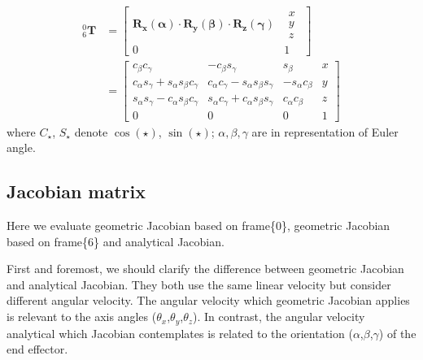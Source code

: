 \begin{equation}
\begin{split}
^0_6\mathbf{T} 
&= 
\begin{bmatrix}
\mathbf{R_x(\alpha ) \cdot R_y(\beta ) \cdot R_z(\gamma )} 
& \begin{matrix}
x\\ 
y\\ 
z
\end{matrix}\\ 
0 & 1
\end{bmatrix}\\
&= 
\begin{bmatrix} 
c_\beta c_\gamma 										& -c_\beta s_\gamma 									& s_\beta 					&x\\ 
c_\alpha s_\gamma +  s_\alpha s_\beta c_\gamma 			& c_\alpha c_\gamma -  s_\alpha s_\beta s_\gamma		& -s_\alpha c_\beta			&y\\ 
s_\alpha s_\gamma -  c_\alpha s_\beta c_\gamma 			& s_\alpha c_\gamma +  c_\alpha s_\beta s_\gamma 		& c_\alpha c_\beta 			&z\\ 
0 														&0 														&0							&1
\end{bmatrix}
\end{split}
\end{equation}
where $C_{\star} $, $ S_{\star}$ denote $\cos \left(\star \right)$, $\sin \left(\star \right)$; $\alpha ,\beta ,\gamma$ are in representation of Euler angle.
\subsection{Jacobian matrix} 
\label{sec:jacobian}
Here we evaluate geometric Jacobian based on frame\{0\}, geometric Jacobian based on frame\{6\} and analytical Jacobian.
\par
First and foremost, we should clarify the difference between geometric Jacobian and analytical Jacobian. They both use the same linear velocity but consider different angular velocity. The angular velocity which geometric Jacobian applies is relevant to the axis angles ($\theta _x$,$\theta _y$,$\theta _z$). In contrast, the angular velocity analytical which Jacobian contemplates is related to the orientation ($\alpha$,$\beta$,$\gamma$) of the end effector.

